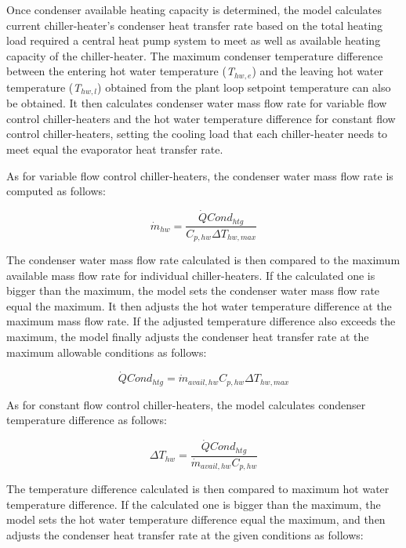 Once condenser available heating capacity is determined, the model calculates current chiller-heater's condenser heat transfer rate based on the total heating load required a central heat pump system to meet as well as available heating capacity of the chiller-heater. The maximum condenser temperature difference between the entering hot water temperature (\emph{T\(_{hw,e}\)}) and the leaving hot water temperature (\emph{T\(_{hw,l}\)}) obtained from the plant loop setpoint temperature can also be obtained. It then calculates condenser water mass flow rate for variable flow control chiller-heaters and the hot water temperature difference for constant flow control chiller-heaters, setting the cooling load that each chiller-heater needs to meet equal the evaporator heat transfer rate.

As for variable flow control chiller-heaters, the condenser water mass flow rate is computed as follows:

\begin{equation}
{\dot m_{hw}} = \frac{{\dot QCon{d_{htg}}}}{{{C_{p,hw}}\Delta {T_{hw,max}}}}
\end{equation}

The condenser water mass flow rate calculated is then compared to the maximum available mass flow rate for individual chiller-heaters. If the calculated one is bigger than the maximum, the model sets the condenser water mass flow rate equal the maximum. It then adjusts the hot water temperature difference at the maximum mass flow rate. If the adjusted temperature difference also exceeds the maximum, the model finally adjusts the condenser heat transfer rate at the maximum allowable conditions as follows:

\begin{equation}
\dot QCon{d_{htg}} = {\dot m_{avail,hw}}{C_{p,hw}}\Delta {T_{hw,max}}
\end{equation}

As for constant flow control chiller-heaters, the model calculates condenser temperature difference as follows:

\begin{equation}
\Delta {T_{hw}} = \frac{{\dot QCon{d_{htg}}}}{{{{\dot m}_{avail,hw}}{C_{p,hw}}}}
\end{equation}

The temperature difference calculated is then compared to maximum hot water temperature difference. If the calculated one is bigger than the maximum, the model sets the hot water temperature difference equal the maximum, and then adjusts the condenser heat transfer rate at the given conditions as follows:


